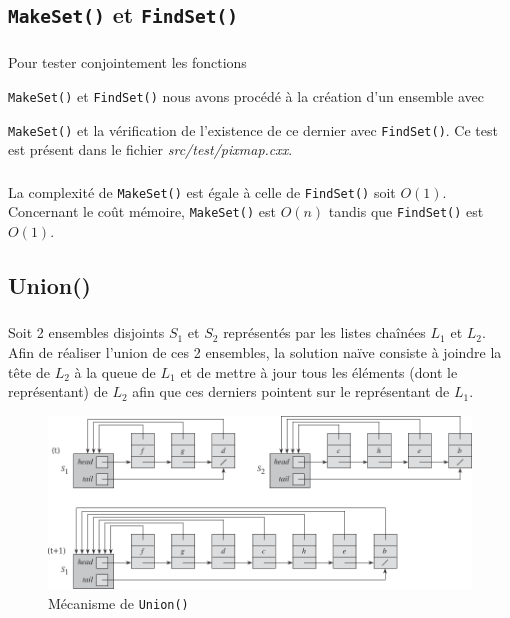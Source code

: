 \documentclass[10pt,a4paper]{article}
\begin{document}
\subsection{\texttt{MakeSet()} et \texttt{FindSet()}}

\subsubsection{}
Pour tester conjointement les fonctions {\texttt{MakeSet()} et \texttt{FindSet()} nous avons procédé à la création d'un ensemble avec {\texttt{MakeSet()} et la vérification de l'existence de ce dernier avec \texttt{FindSet()}.
Ce test est présent dans le fichier \textit{src/test/pixmap.cxx}.

\subsubsection{} \label{2.2}
La complexité de \texttt{MakeSet()} est égale à celle de \texttt{FindSet()} soit $O(1)$.
Concernant le co\^ut mémoire, \texttt{MakeSet()} est $O(n)$ tandis que \texttt{FindSet()} est $O(1)$.

\subsection{Union()}
\subsubsection{} \label{3.1}
Soit 2 ensembles disjoints $S_{1}$ et $S_{2}$ représentés par les listes chaînées $L_{1}$ et $L_{2}$. Afin de réaliser l'union de ces 2 ensembles, la solution naïve consiste à joindre la tête de $L_{2}$ à la queue de $L_{1}$ et de mettre à jour tous les éléments (dont le représentant) de $L_{2}$ afin que ces derniers pointent sur le représentant de $L_{1}$.

\begin{figure}[h]
\centering
\includegraphics{3-1.pdf}
\caption{Mécanisme de \texttt{Union()}}
\end{figure}

}}
\end{document}
